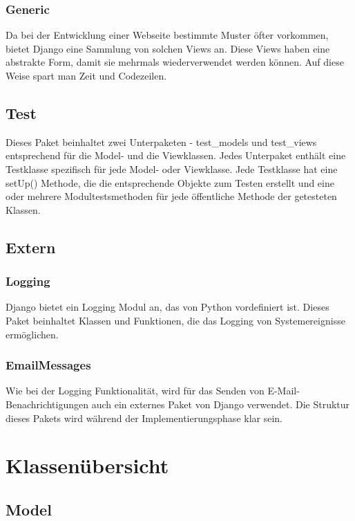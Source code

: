 \documentclass[parskip=full,11pt]{scrartcl}
\begin{document}
 \subsubsection{Generic}
 Da bei der Entwicklung einer Webseite bestimmte Muster öfter vorkommen,  bietet Django eine Sammlung von solchen Views an. Diese Views haben eine abstrakte Form, damit sie mehrmals wiederverwendet werden können. Auf diese Weise spart man Zeit und Codezeilen.

 
 \subsection{Test}
 Dieses Paket beinhaltet zwei Unterpaketen - test{\_}models und test{\_}views entsprechend für die Model- und die Viewklassen. Jedes Unterpaket enthält eine Testklasse spezifisch für jede Model- oder Viewklasse. Jede Testklasse hat eine setUp() Methode, die die entsprechende Objekte zum Testen erstellt und eine oder mehrere Modultestsmethoden für jede öffentliche Methode der getesteten Klassen.
 
 \subsection{Extern}
 \subsubsection{Logging}
 Django bietet ein Logging Modul an, das von Python vordefiniert ist.
 Dieses Paket beinhaltet Klassen und Funktionen, die das Logging von Systemereignisse ermöglichen. 
 \subsubsection{EmailMessages}
 Wie bei der Logging Funktionalität, wird für das Senden von E-Mail-Benachrichtigungen auch ein externes Paket von Django verwendet. Die Struktur dieses Pakets wird während der Implementierungsphase klar sein. 
 
 
 \newpage
 \section{Klassenübersicht}
 \subsection{Model}
\end{document}
